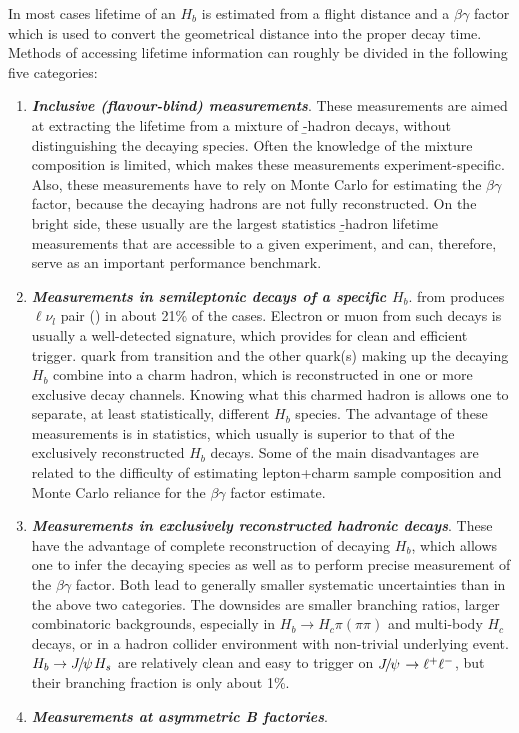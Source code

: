 In most cases lifetime of an $H_b$ is estimated from a flight distance
and a $\beta\gamma$ factor which is used to convert the geometrical
distance into the proper decay time.  Methods of accessing lifetime
information can roughly be divided in the following five categories:
\begin{enumerate}
\item {\bf\em Inclusive (flavour-blind) measurements}.  These
  measurements are aimed at extracting the lifetime from a mixture of
  \b-hadron decays, without distinguishing the decaying species.  Often
  the knowledge of the mixture composition is limited, which makes these
  measurements experiment-specific.  Also, these
  measurements have to rely on Monte Carlo for estimating the
  $\beta\gamma$ factor, because the decaying hadrons are not fully
  reconstructed.  On the bright side, these usually are the largest
  statistics \b-hadron lifetime measurements that are accessible to a
  given experiment, and can, therefore, serve as an important
  performance benchmark.
\item {\bf\em Measurements in semileptonic decays of a specific
  {\boldmath $H_b$\unboldmath}}.  from 
  produces $\ell\nu_l$ pair () in about 21\% of the
  cases.  Electron or muon from such decays is usually a well-detected
  signature, which provides for clean and efficient trigger.
   quark from  transition and the other
  quark(s) making up the decaying $H_b$ combine into a charm hadron,
  which is reconstructed in one or more exclusive decay channels.
  Knowing what this charmed hadron is allows one to separate, at least
  statistically, different $H_b$ species.  The advantage of these
  measurements is in statistics, which usually is superior to that of the
  exclusively reconstructed $H_b$ decays.  Some of the main
  disadvantages are related to the difficulty of estimating lepton+charm
  sample composition and Monte Carlo reliance for the $\beta\gamma$
  factor estimate.
\item {\bf\em Measurements in exclusively reconstructed hadronic decays}.
  These
  have the advantage of complete reconstruction of decaying $H_b$, which
  allows one to infer the decaying species as well as to perform precise
  measurement of the $\beta\gamma$ factor.  Both lead to generally
  smaller systematic uncertainties than in the above two categories.
  The downsides are smaller branching ratios, larger combinatoric
  backgrounds, especially in $H_b\rightarrow H_c\pi(\pi\pi)$ and
  multi-body $H_c$ decays, or in a hadron collider environment with
  non-trivial underlying event.  $H_b\to {J\mskip -3mu/\mskip -2mu\psi\mskip 2mu} H_s$ are relatively
  clean and easy to trigger on ${J\mskip -3mu/\mskip -2mu\psi\mskip 2mu}\to \ell^+\ell^-$, but their
  branching fraction is only about 1\%.
\item {\bf\em Measurements at asymmetric B factories}. 


\end{enumerate}
